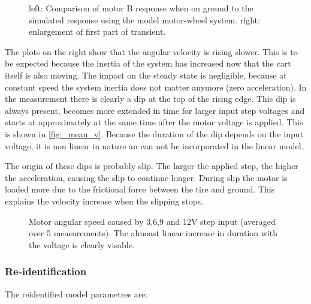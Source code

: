 \documentclass[a4paper]{article}
\newcommand{\newpar}{\vspace{.3cm}\noindent}
\begin{document}
\begin{figure}[H]
    \caption{left: Comparison of motor B response when on ground to the simulated response using the model motor-wheel system. right: enlargement of first part of transient.}
    \label{fig:loadunloadcompB}
\end{figure}

\newpar
The plots on the right show that the angular velocity is rising slower. This is to be expected because the inertia of the system has increased now that the cart itself is also moving. The impact on the steady state is negligible, because at constant speed the system inertia does not matter anymore (zero acceleration). In the measurement there is clearly a dip at the top of the rising edge. This dip is always present, becomes more extended in time for larger input step voltages and starts at approximately at the same time after the motor voltage is applied. This is shown in \autoref{fig:_mean_v}. Because the duration of the dip depends on the input voltage, it is non linear in nature an can not be incorporated in the linear model.

\newpar
The origin of these dips is probably slip. The larger the applied step, the higher the acceleration, causing the slip to continue longer. During slip the motor is loaded more due to the frictional force between the tire and ground. This explains the velocity increase when the slipping stops.


\begin{figure}[H]
    \caption{Motor angular speed caused by 3,6,9 and 12V step input (averaged over 5 measurements). The almoast linear increase in duration with the voltage is clearly visable.}
    \label{fig:_mean_v}
\end{figure}

\subsubsection{Re-identification}
The reidentified model parametres are:
\end{document}
